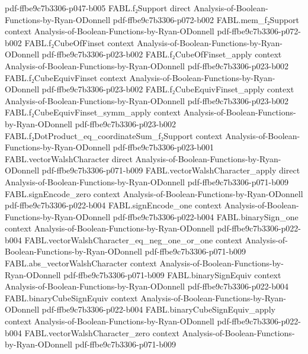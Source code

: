\begin{theorem}
  {pdf-ffbe9c7b3306-p047-b005}
\proofstep
  {FABL.f₂Support}
  {direct}
  {Analysis-of-Boolean-Functions-by-Ryan-ODonnell}
  {pdf-ffbe9c7b3306-p072-b002}
\proofstep
  {FABL.mem_f₂Support}
  {context}
  {Analysis-of-Boolean-Functions-by-Ryan-ODonnell}
  {pdf-ffbe9c7b3306-p072-b002}
\proofstep
  {FABL.f₂CubeOfFinset}
  {context}
  {Analysis-of-Boolean-Functions-by-Ryan-ODonnell}
  {pdf-ffbe9c7b3306-p023-b002}
\proofstep
  {FABL.f₂CubeOfFinset_apply}
  {context}
  {Analysis-of-Boolean-Functions-by-Ryan-ODonnell}
  {pdf-ffbe9c7b3306-p023-b002}
\proofstep
  {FABL.f₂CubeEquivFinset}
  {context}
  {Analysis-of-Boolean-Functions-by-Ryan-ODonnell}
  {pdf-ffbe9c7b3306-p023-b002}
\proofstep
  {FABL.f₂CubeEquivFinset_apply}
  {context}
  {Analysis-of-Boolean-Functions-by-Ryan-ODonnell}
  {pdf-ffbe9c7b3306-p023-b002}
\proofstep
  {FABL.f₂CubeEquivFinset_symm_apply}
  {context}
  {Analysis-of-Boolean-Functions-by-Ryan-ODonnell}
  {pdf-ffbe9c7b3306-p023-b002}
\proofstep
  {FABL.f₂DotProduct_eq_coordinateSum_f₂Support}
  {context}
  {Analysis-of-Boolean-Functions-by-Ryan-ODonnell}
  {pdf-ffbe9c7b3306-p023-b001}
\proofstep
  {FABL.vectorWalshCharacter}
  {direct}
  {Analysis-of-Boolean-Functions-by-Ryan-ODonnell}
  {pdf-ffbe9c7b3306-p071-b009}
\proofstep
  {FABL.vectorWalshCharacter_apply}
  {direct}
  {Analysis-of-Boolean-Functions-by-Ryan-ODonnell}
  {pdf-ffbe9c7b3306-p071-b009}
\proofstep
  {FABL.signEncode_zero}
  {context}
  {Analysis-of-Boolean-Functions-by-Ryan-ODonnell}
  {pdf-ffbe9c7b3306-p022-b004}
\proofstep
  {FABL.signEncode_one}
  {context}
  {Analysis-of-Boolean-Functions-by-Ryan-ODonnell}
  {pdf-ffbe9c7b3306-p022-b004}
\proofstep
  {FABL.binarySign_one}
  {context}
  {Analysis-of-Boolean-Functions-by-Ryan-ODonnell}
  {pdf-ffbe9c7b3306-p022-b004}
\proofstep
  {FABL.vectorWalshCharacter_eq_neg_one_or_one}
  {context}
  {Analysis-of-Boolean-Functions-by-Ryan-ODonnell}
  {pdf-ffbe9c7b3306-p071-b009}
\proofstep
  {FABL.abs_vectorWalshCharacter}
  {context}
  {Analysis-of-Boolean-Functions-by-Ryan-ODonnell}
  {pdf-ffbe9c7b3306-p071-b009}
\proofstep
  {FABL.binarySignEquiv}
  {context}
  {Analysis-of-Boolean-Functions-by-Ryan-ODonnell}
  {pdf-ffbe9c7b3306-p022-b004}
\proofstep
  {FABL.binaryCubeSignEquiv}
  {context}
  {Analysis-of-Boolean-Functions-by-Ryan-ODonnell}
  {pdf-ffbe9c7b3306-p022-b004}
\proofstep
  {FABL.binaryCubeSignEquiv_apply}
  {context}
  {Analysis-of-Boolean-Functions-by-Ryan-ODonnell}
  {pdf-ffbe9c7b3306-p022-b004}
\proofstep
  {FABL.vectorWalshCharacter_zero}
  {context}
  {Analysis-of-Boolean-Functions-by-Ryan-ODonnell}
  {pdf-ffbe9c7b3306-p071-b009}

\end{theorem}
